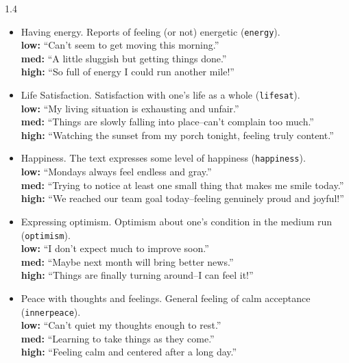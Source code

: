 \documentclass[10pt, letterpaper]{article}
\begin{document}
\begin{spacing}{1.4}
\begin{itemize}
\item Having energy. Reports of feeling (or not) energetic (\texttt{energy}).\\
  \textbf{low:} ``Can't seem to get moving this morning.'' \\
  \textbf{med:} ``A little sluggish but getting things done.'' \\
  \textbf{high:} ``So full of energy I could run another mile!''
\end{itemize}



\begin{itemize}
\item Life Satisfaction.  Satisfaction with one's life as a whole (\texttt{lifesat}).\\
  \textbf{low:} ``My living situation is exhausting and unfair.'' \\
  \textbf{med:} ``Things are slowly falling into place--can't complain too much.'' \\
  \textbf{high:} ``Watching the sunset from my porch tonight, feeling truly
  content.''

 \item Happiness. The text expresses some level of happiness (\texttt{happiness}).\\
\textbf{low:} ``Mondays always feel endless and gray.'' \\
\textbf{med:} ``Trying to notice at least one small thing that makes me smile today.'' \\
\textbf{high:} ``We reached our team goal today--feeling genuinely proud and joyful!'' 
  
\item Expressing optimism. Optimism about one's condition in the medium run (\texttt{optimism}).\\
\textbf{low:} ``I don't expect much to improve soon.'' \\
\textbf{med:} ``Maybe next month will bring better news.'' \\
\textbf{high:} ``Things are finally turning around--I can feel it!'' 

\item Peace with thoughts and feelings. General feeling of calm acceptance (\texttt{innerpeace}).\\
\textbf{low:} ``Can't quiet my thoughts enough to rest.'' \\
\textbf{med:} ``Learning to take things as they come.'' \\
\textbf{high:} ``Feeling calm and centered after a long day.'' 


\end{itemize}
\end{spacing}
\end{document}

